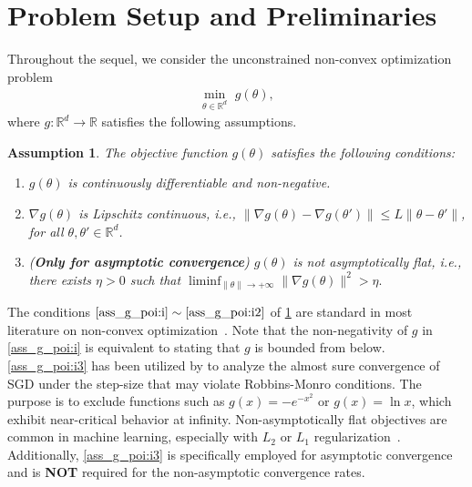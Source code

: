 \documentclass[standalone]{article}
\newcommand{\R}{\mathbb{R}}
\newtheorem{assumpt}{Assumption}[section]
\begin{document}
\section{Problem Setup and Preliminaries}\label{sec:prelim}
Throughout the sequel, we consider the unconstrained non-convex optimization problem
\begin{align}\label{P1}
    \min_{\theta \in \R^d} \,\, g(\theta),
\end{align}
where $g: \R^d \rightarrow \R$ satisfies the following assumptions.%
\begin{assumpt}\label{ass_g_poi} The objective function $g(\theta)$ satisfies the following conditions:
\begin{enumerate}[label=\textnormal{(\roman*)},leftmargin=*]
\item\label{ass_g_poi:i} $g(\theta)$ is continuously differentiable and non-negative.
\item\label{ass_g_poi:i2} $\nabla g(\theta)$ is Lipschitz continuous, i.e., $
\big\|\nabla g(\theta)-\nabla g(\theta')\big\|\le L\|\theta-\theta'\| $, for all $\theta, \theta' \in \mathbb{R}^{d}$.
\item\label{ass_g_poi:i3}(\textbf{Only for asymptotic convergence}) $g(\theta)$ is not asymptotically flat, i.e., there exists $\eta>0$ such that $\liminf_{\|\theta\|\rightarrow+\infty} \|\nabla g(\theta)\|^{2}>\eta.$

\end{enumerate}
\end{assumpt}



The conditions $\ref{ass_g_poi:i}\sim\ref{ass_g_poi:i2}$ of  \cref{ass_g_poi}  are standard in most literature on non-convex optimization~\citep{bottou2018optimization}. Note that the non-negativity of $g$ in \cref{ass_g_poi:i} is equivalent to stating that $g$ is bounded from below. %
\cref{ass_g_poi:i3} has been utilized by \cite{mertikopoulos2020almost} to analyze the almost sure convergence of SGD under the step-size that may violate Robbins-Monro conditions. The purpose is to exclude functions such as $g(x)=-e^{-x^{2}}$ or $g(x)=\ln x$, which exhibit near-critical behavior at infinity.  Non-asymptotically flat objectives are common in machine learning, especially with $L_2$ or $L_1$ regularization~\citep{ng2004feature,bishop2006pattern,zhang2004solving,goodfellow2016deep}. Additionally,  \cref{ass_g_poi:i3} is specifically employed for asymptotic convergence and is \textbf{NOT} required for the non-asymptotic convergence rates.
\end{document}
